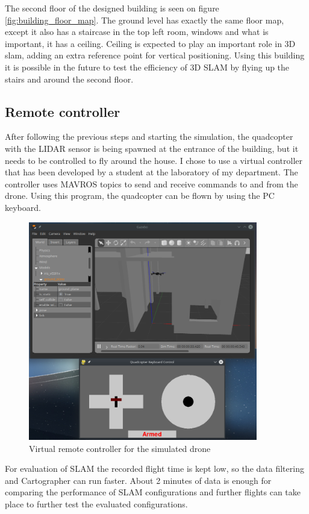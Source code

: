 The second floor of the designed building is seen on figure \ref{fig:building_floor_map}. The ground
level has exactly the same floor map, except it also has a staircase in the top left room, windows
and what is important, it has a ceiling. Ceiling is expected to play an important role in 3D slam,
adding an extra reference point for vertical positioning. Using this building it is possible in 
the future to test the efficiency of 3D SLAM by flying up the stairs and around the second floor.

\subsection{Remote controller}
After following the previous steps and starting the simulation, the quadcopter with the LIDAR sensor
is being spawned at the entrance of the building, but it needs to be controlled to fly around the 
house. I chose to use a virtual controller that has been developed by a student at the laboratory 
of my department. The controller uses MAVROS topics to send and receive commands to and from the drone. 
Using this program, the quadcopter can be flown by using the PC keyboard. 

\begin{figure}[!ht]
    \centering
    \includegraphics[width=100mm, keepaspectratio]{figures/fly_with_controller.png}
    \caption{Virtual remote controller for the simulated drone}
    \label{fig:remote_controller}
\end{figure}

For evaluation of SLAM the recorded flight time is kept low, so the data filtering and Cartographer 
can run faster. About 2 minutes of data is enough for comparing the performance of SLAM configurations
and further flights can take place to further test the evaluated configurations.

